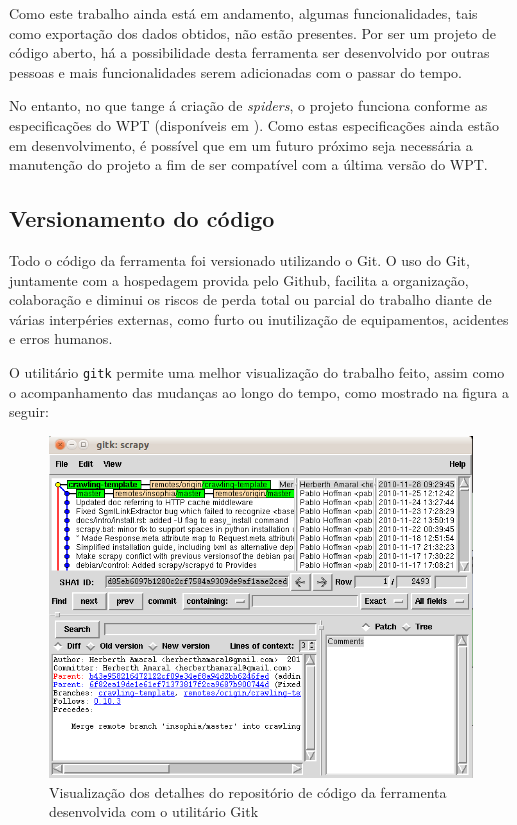 Como este trabalho ainda está em andamento, algumas funcionalidades, tais como exportação dos dados obtidos, não estão presentes. Por ser um projeto de código aberto, há a possibilidade desta ferramenta ser desenvolvido por outras pessoas e mais funcionalidades serem adicionadas com o passar do tempo.

No entanto, no que tange á criação de \emph{spiders}, o projeto funciona conforme as especificações do WPT (disponíveis em \cite{wpt}). Como estas especificações ainda estão em desenvolvimento, é possível que em um futuro próximo seja necessária a manutenção do projeto a fim de ser compatível com a última versão do WPT.

\subsection{Versionamento do código}

Todo o código da ferramenta foi versionado utilizando o Git. O uso do Git, juntamente com a hospedagem provida pelo Github, facilita a organização, colaboração e diminui os riscos de perda total ou parcial do trabalho diante de várias interpéries externas, como furto ou inutilização de equipamentos, acidentes e erros humanos.

O utilitário \texttt{gitk} permite uma melhor visualização do trabalho feito, assim como o acompanhamento das mudanças ao longo do tempo, como mostrado na figura a seguir:

\begin{figure} [ht]
	\begin{center}
		\includegraphics[scale=0.5]{gitk.png}
	\end{center}
	\caption{Visualização dos detalhes do repositório de código da ferramenta desenvolvida com o utilitário Gitk}
	\label{gitk}
\end{figure}


